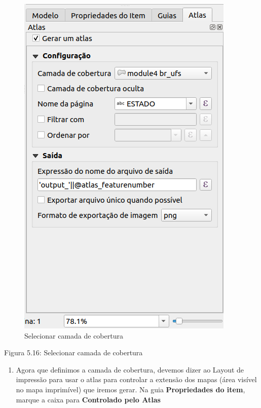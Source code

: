 \documentclass[
]{krantz}
\providecommand{\tightlist}{%
  \setlength{\itemsep}{0pt}\setlength{\parskip}{0pt}}
\begin{document}
\begin{figure}
\centering
\includegraphics{media/modulo5/coverage-layer.png}
\caption{Selecionar camada de cobertura}
\end{figure}

Figura 5.16: Selecionar camada de cobertura

\begin{enumerate}
\def\labelenumi{\arabic{enumi}.}
\setcounter{enumi}{3}
\tightlist
\item
  Agora que definimos a camada de cobertura, devemos dizer ao Layout de impressão para usar o atlas para controlar a extensão dos mapas (área visível no mapa imprimível) que iremos gerar. Na guia \textbf{Propriedades do item}, marque a caixa para \textbf{Controlado pelo Atlas}
\end{enumerate}
\end{document}
